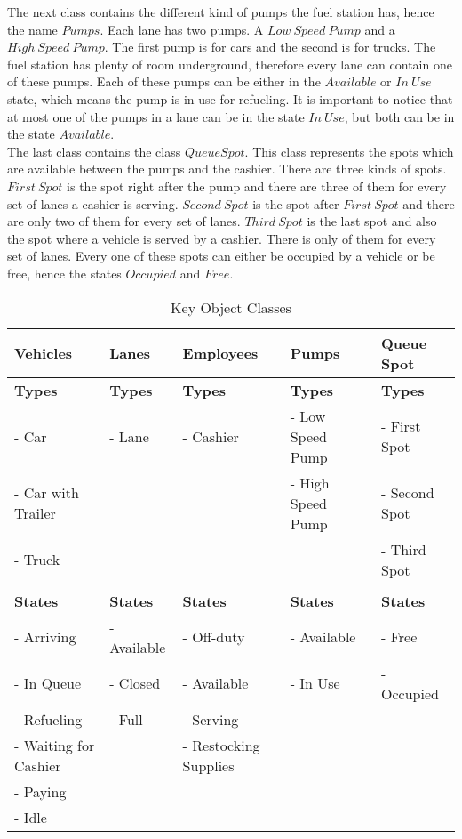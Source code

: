 \indent The next class contains the different kind of pumps the fuel station has, hence the name $Pumps$. Each lane has two pumps. A $Low \  Speed \ Pump$ and a $High \ Speed \ Pump$. The first pump is for cars and the second is for trucks. The fuel station has plenty of room underground, therefore every lane can contain one of these pumps. Each of these pumps can be either in the $Available$ or $In \ Use$ state, which means the pump is in use for refueling. It is important to notice that at most one of the pumps in a lane can be in the state $In \ Use$, but both can be in the state $Available$.\\
\indent The last class contains the class $Queue Spot$. This class represents the spots which are available between the pumps and the cashier. There are three kinds of spots. $First \ Spot$ is the spot right after the pump and there are three of them for every set of lanes a cashier is serving. $Second \ Spot$ is the spot after $First \ Spot$ and there are only two of them for every set of lanes. $Third \ Spot$ is the last spot and also the spot where a vehicle is served by a cashier. There is only of them for every set of lanes. Every one of these spots can either be occupied by a vehicle or be free, hence the states $Occupied$ and $Free$.

\begin{center}
\begin{table}[h]
\begin{tabular}{| l | l | l | l | l |}
\hline
\textbf{Vehicles} & \textbf{Lanes} & \textbf{Employees} & \textbf{Pumps} & \textbf{Queue Spot}\\
\hline
\textbf{Types} & \textbf{Types} & \textbf{Types} & \textbf{Types} & \textbf{Types}\\
- Car & - Lane & - Cashier& - Low Speed Pump & - First Spot\\
- Car with Trailer & & & - High Speed Pump & - Second Spot\\
- Truck & & & & - Third Spot\\
& & & & \\
\textbf{States} & \textbf{States} & \textbf{States} & \textbf{States} & \textbf{States}\\
- Arriving & - Available & - Off-duty & - Available & - Free\\
- In Queue & - Closed & - Available & - In Use & - Occupied\\
- Refueling & - Full & - Serving & &\\
- Waiting for Cashier & & - Restocking Supplies & &\\
- Paying & & & &\\
- Idle & & & &\\
\hline
\end{tabular}
\caption{Key Object Classes}
\label{tab:koc}
\end{table}
\end{center}

